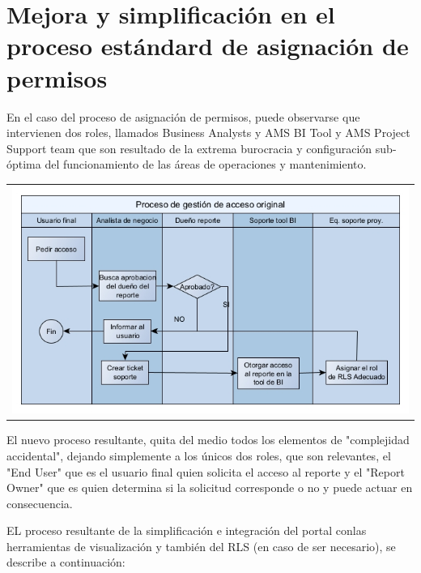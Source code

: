 
\section{Mejora y simplificación en el proceso estándard de asignación de permisos}

En el caso del proceso de asignación de permisos, puede observarse que intervienen dos roles, llamados Business Analysts y AMS BI Tool y AMS Project Support team que son resultado de la extrema burocracia y configuración sub-óptima del funcionamiento de las áreas de operaciones y mantenimiento.
\vspace{1cm}

\begin{tabular}{l}
\includegraphics[width=15cm]{Workflow-aprobacion-original.jpg}
\end{tabular}

El nuevo proceso resultante, quita del medio todos los elementos de "complejidad accidental", dejando simplemente a los únicos dos roles, que son relevantes, el "End User" que es el usuario final quien solicita el acceso al reporte y el "Report Owner" que es quien determina si la solicitud corresponde o no y puede actuar en consecuencia.

EL proceso resultante de la simplificación e integración del portal conlas herramientas de visualización y también del RLS (en caso de ser necesario), se describe a continuación:

